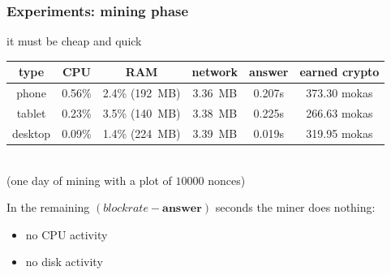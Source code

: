 \documentclass[11pt]{beamer}  %
\begin{document}
\begin{frame}\frametitle{Experiments: mining phase}

  \begin{center}
    \alert{it must be cheap and quick}
  \end{center}

  \medskip

  \begin{center}
    \hspace*{-1ex}\begin{tabular}{|c||c|c|c|c|c|}
      \hline
      \textbf{type} & \textbf{CPU} & \textbf{RAM} & \textbf{network} & \textbf{answer} & \textbf{earned crypto} \\\hline\hline
      phone & 0.56\% & 2.4\% (192~MB) & 3.36~MB & 0.207s & 373.30 mokas \\\hline
      tablet & 0.23\% & 3.5\% (140~MB) & 3.38~MB & 0.225s & 266.63 mokas \\\hline
      desktop & 0.09\% & 1.4\% (224~MB) & 3.39~MB & 0.019s & 319.95 mokas \\\hline
    \end{tabular}
    \vspace*{1ex}\\
    (one day of mining with a plot of $10000$ nonces)
  \end{center}

  \bigskip

  In the remaining $(\mathit{blockrate}-\mathbf{answer})$ seconds the miner does \alert{nothing}:
  \begin{itemize}
  \item no CPU activity
  \item no disk activity
  \end{itemize}

\end{frame}
\end{document}
